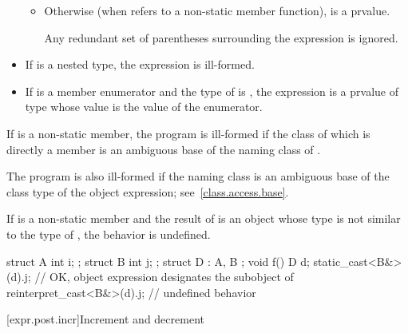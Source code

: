 \begin{itemize}
\begin{itemize}
\item Otherwise (when  refers to a non-static member function),
 is a prvalue.
\begin{note}
Any redundant set of parentheses surrounding the expression
is ignored.
\end{note}
\end{itemize}

\item If  is a nested type, the expression  is
ill-formed.

\item If  is a member enumerator and the type of 
is , the expression  is a prvalue of type 
whose value is the value of the enumerator.
\end{itemize}

\pnum
If  is a non-static member,
the program is ill-formed if the class of which  is
directly a member is an ambiguous base of
the naming class of .
\begin{note}
The program is also ill-formed if the naming class is an ambiguous base of the class type
of the object expression; see~\ref{class.access.base}.
\end{note}

\pnum
If  is a non-static member and
the result of  is an object whose type
is not similar to the type of ,
the behavior is undefined.
\begin{example}
\begin{codeblock}
struct A { int i; };
struct B { int j; };
struct D : A, B {};
void f() {
  D d;
  static_cast<B&>(d).j;             // OK, object expression designates the  subobject of 
  reinterpret_cast<B&>(d).j;        // undefined behavior
}
\end{codeblock}
\end{example}

[expr.post.incr]{Increment and decrement}

